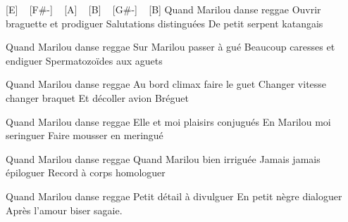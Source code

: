 
[E] ~ [F#-] ~ [A] ~ [B] ~ [G#-] ~ [B]
Quand Marilou danse reggae
Ouvrir braguette et prodiguer
Salutations distinguées
De petit serpent katangais


Quand Marilou danse reggae
Sur Marilou passer à gué
Beaucoup caresses et endiguer
Spermatozoïdes aux aguets

Quand Marilou danse reggae
Au bord climax faire le guet
Changer vitesse changer braquet
Et décoller avion Bréguet

Quand Marilou danse reggae
Elle et moi plaisirs conjugués
En Marilou moi seringuer
Faire mousser en meringué

Quand Marilou danse reggae
Quand Marilou bien irriguée
Jamais jamais épiloguer
Record à corps homologuer

Quand Marilou danse reggae
Petit détail à divulguer
En petit nègre dialoguer
Après l'amour biser sagaie. 